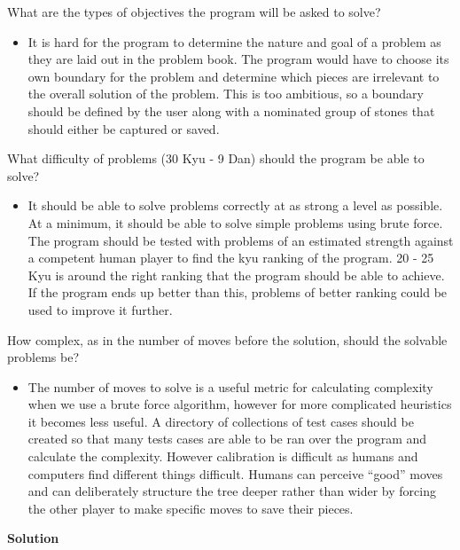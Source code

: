 \documentclass{l3proj}
\begin{document}
What are the types of objectives the program will be asked to solve?
\begin{itemize}
\item It is hard for the program to determine the nature and goal of a problem as they are laid out in the problem book.  The program would have to choose its own boundary for the problem and determine which pieces are irrelevant to the overall solution of the problem.  This is too ambitious, so a boundary should be defined by the user along with a nominated group of stones that should either be captured or saved.
\end{itemize}
What difficulty of problems (30 Kyu - 9 Dan) should the program be able to solve?
\begin{itemize}
\item It should be able to solve problems correctly at as strong a level as possible.  At a minimum, it should be able to solve simple problems using brute force.  The program should be tested with problems of an estimated strength against a competent human player to find the kyu ranking of the program.  20 - 25 Kyu is around the right ranking that the program should be able to achieve.  If the program ends up better than this, problems of better ranking could be used to improve it further.
\end{itemize}
How complex, as in the number of moves before the solution, should the solvable problems be?
\begin{itemize}
\item The number of moves to solve is a useful metric for calculating complexity when we use a brute force algorithm, however for more complicated heuristics it becomes less useful.  A directory of collections of test cases should be created so that many tests cases are able to be ran over the program and calculate the complexity.  However calibration is difficult as humans and computers find different things difficult.  Humans can perceive “good” moves and can deliberately structure the tree deeper rather than wider by forcing the other player to make specific moves to save their pieces.
\end{itemize}

\textbf{Solution}
\end{document}
